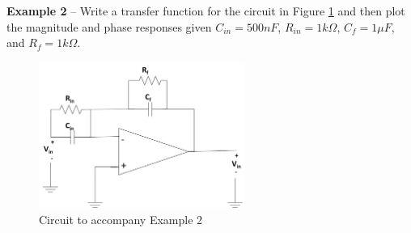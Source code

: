 \documentclass{handout}
\begin{document}
\textbf{Example 2} -- Write a transfer function for the circuit in Figure \ref{fig: Example2} and then plot the magnitude and phase responses given $C_{in}=500nF$, $R_{in} =1k\Omega$, $C_f=1\mu F$, and $R_f=1k\Omega$.
\begin{figure} [h!]
\centering
\includegraphics[width=0.6\textwidth]{Example2.jpg}
\caption{Circuit to accompany Example 2}
\label{fig: Example2}
\end{figure}
\end{document}
